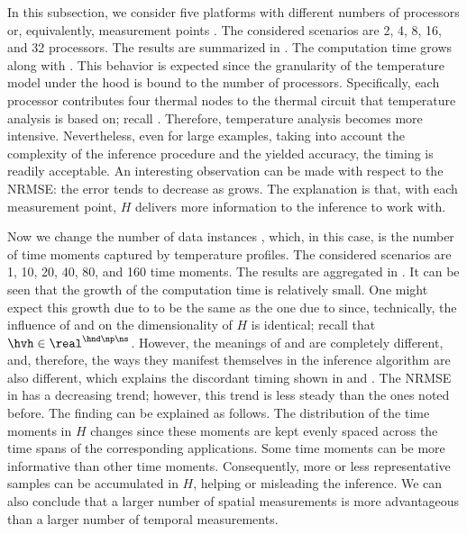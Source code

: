 
In this subsection, we consider five platforms with different numbers of
processors or, equivalently, measurement points \np. The considered scenarios
are 2, 4, 8, 16, and 32 processors. The results are summarized in
. The computation time grows along with \np. This
behavior is expected since the granularity of the temperature model under the
hood is bound to the number of processors. Specifically, each processor
contributes four thermal nodes to the thermal  circuit that temperature
analysis is based on; recall . Therefore, temperature
analysis becomes more intensive. Nevertheless, even for large examples, taking
into account the complexity of the inference procedure and the yielded accuracy,
the timing is readily acceptable. An interesting observation can be made with
respect to the \ac{NRMSE}: the error tends to decrease as \np grows. The
explanation is that, with each measurement point, $H$ delivers more information
to the inference to work with.


Now we change the number of data instances \ns, which, in this case, is the
number of time moments captured by temperature profiles. The considered
scenarios are 1, 10, 20, 40, 80, and 160 time moments. The results are
aggregated in . It can be seen that the growth of the
computation time is relatively small. One might expect this growth due to \ns to
be the same as the one due to \np since, technically, the influence of \np and
\ns on the dimensionality of $H$ is identical; recall that $\hvh \in \real^{\hnd
\np \ns}$. However, the meanings of \np and \ns are completely different, and,
therefore, the ways they manifest themselves in the inference algorithm are also
different, which explains the discordant timing shown in 
and . The \ac{NRMSE} in  has
a decreasing trend; however, this trend is less steady than the ones noted
before. The finding can be explained as follows. The distribution of the time
moments in $H$ changes since these moments are kept evenly spaced across the
time spans of the corresponding applications. Some time moments can be more
informative than other time moments. Consequently, more or less representative
samples can be accumulated in $H$, helping or misleading the inference. We can
also conclude that a larger number of spatial measurements is more advantageous
than a larger number of temporal measurements.

